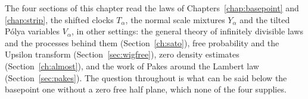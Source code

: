 \label{chap:almost}

The four sections of this chapter read the laws of Chapters~\ref{chap:basepoint} and \ref{chap:strip}, the shifted clocks $T_\alpha$, the normal scale mixtures $Y_\alpha$ and the tilted P\'olya variables $V_\alpha$, in other settings: the general theory of infinitely divisible laws and the processes behind them (Section~\ref{ch:sato}), free probability and the Upsilon transform (Section~\ref{sec:wigfree}), zero density estimates (Section~\ref{ch:almost}), and the work of Pakes around the Lambert law (Section~\ref{sec:pakes}). The question throughout is what can be said below the basepoint one without a zero free half plane, which none of the four supplies.
